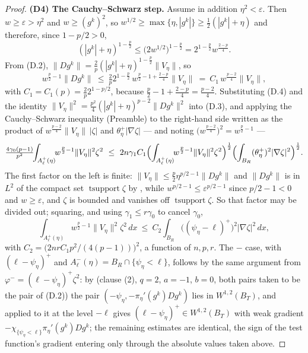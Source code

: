 \begin{proof}
\textbf{(D4) The Cauchy--Schwarz step.}  Assume in addition
$\eta^2<\varepsilon$.  Then $w\ge\varepsilon>\eta^2$ and $w\ge(g^k)^2$, so
$w^{1/2}\ge\max\{\eta,|g^k|\}\ge\tfrac12(|g^k|+\eta)$ and therefore, since
$1-p/2>0$,
\[
(|g^k|+\eta)^{1-\frac p2}\le\bigl(2w^{1/2}\bigr)^{1-\frac p2}
=2^{1-\frac p2}w^{\frac{2-p}4}.
\]
From (D.2), $\|Dg^k\|=\tfrac2p(|g^k|+\eta)^{1-\frac p2}\|V_\eta\|$, so
\[
w^{\frac p2-1}\|Dg^k\|\ \le\ \tfrac2p2^{1-\frac p2}\,
w^{\frac p2-1+\frac{2-p}4}\|V_\eta\|\ =\ C_1\,w^{\frac{p-2}4}\|V_\eta\| ,
\tag{D.4}
\]
with $C_1=C_1(p)=\tfrac2p2^{1-p/2}$, because
$\tfrac p2-1+\tfrac{2-p}4=\tfrac{p-2}4$.  Substituting (D.4) and the identity
$\|V_\eta\|^2=\tfrac{p^2}4(|g^k|+\eta)^{p-2}\|Dg^k\|^2$ into (D.3), and applying
the Cauchy--Schwarz inequality (Preamble) to the right-hand side written as the
product of $w^{\frac{p-2}4}\|V_\eta\|\,|\zeta|$ and
$\theta^+_\eta|\nabla\zeta|$ --- and noting
$\bigl(w^{\frac{p-2}4}\bigr)^2=w^{\frac p2-1}$ ---
\[
\tfrac{4\gamma_0(p-1)}{p^2}\!\!\int_{A^+_\ell(\eta)}\!\!
w^{\frac p2-1}\|V_\eta\|^2\zeta^2
\ \le\ 2n\gamma_1C_1\Bigl(\int_{A^+_\ell(\eta)}\!\!
w^{\frac p2-1}\|V_\eta\|^2\zeta^2\Bigr)^{\frac12}
\Bigl(\int_{B_R}(\theta^+_\eta)^2|\nabla\zeta|^2\Bigr)^{\frac12}.
\]
The first factor on the left is finite: $\|V_\eta\|\le\tfrac
p2\eta^{p/2-1}\|Dg^k\|$ and $\|Dg^k\|$ is in $L^2$ of the compact set
$\operatorname{tsupport}\zeta$ by , while
$w^{p/2-1}\le\varepsilon^{p/2-1}$ since $p/2-1<0$ and $w\ge\varepsilon$, and
$\zeta$ is bounded and vanishes off $\operatorname{tsupport}\zeta$.  So that
factor may be divided out; squaring, and using $\gamma_1\le r\gamma_0$ to
cancel $\gamma_0$,
\[
\int_{A^+_\ell(\eta)}w^{\frac p2-1}\|V_\eta\|^2\zeta^2\,dx
\ \le\ C_2\int_{B_R}\bigl((\psi_\eta-\ell)^+\bigr)^2|\nabla\zeta|^2\,dx ,
\tag{D.5}
\]
with $C_2=\bigl(2nrC_1p^2/(4(p-1))\bigr)^2$, a function of $n,p,r$.  The $-$
case, with $(\ell-\psi_\eta)^+$ and $A^-_\ell(\eta)=B_R\cap\{\psi_\eta<\ell\}$,
follows by the same argument from $\varphi^-=(\ell-\psi_\eta)^+\zeta^2$: by
 (clause (2), $q=2$, $a=-1$, $b=0$, both pairs taken
to be the pair of (D.2)) the pair $(-\psi_\eta,-\pi_\eta'(g^k)Dg^k)$ lies in
$W^{1,2}(B_T)$, and  applied to it at the
level $-\ell$ gives $(\ell-\psi_\eta)^+\in W^{1,2}(B_T)$ with weak gradient
$-\chi_{\{\psi_\eta<\ell\}}\pi_\eta'(g^k)Dg^k$; the remaining estimates are
identical, the sign of the test function's gradient entering only through the
absolute values taken above.


\end{proof}
